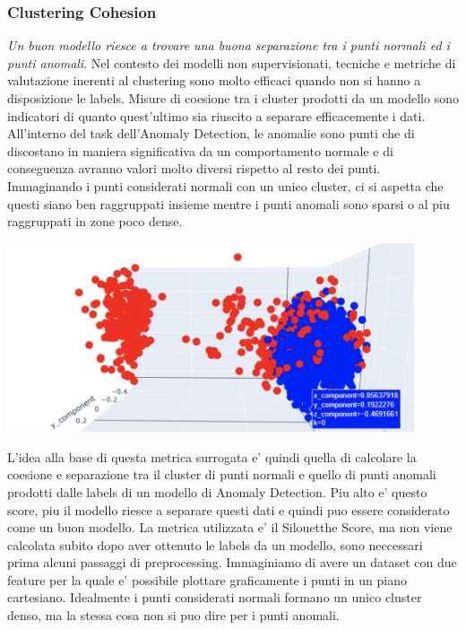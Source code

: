 \subsubsection{Clustering Cohesion}
\textit{Un buon modello riesce a trovare una buona separazione tra i punti normali ed i punti anomali}.
Nel contesto dei modelli non supervisionati, tecniche e metriche di valutazione inerenti al clustering sono molto efficaci quando non si hanno a disposizione le labels. Misure di coesione tra i cluster prodotti da un modello sono indicatori di quanto quest'ultimo sia riuscito a separare efficacemente i dati.
All'interno del task dell'Anomaly Detection, le anomalie sono punti che di discostano in maniera significativa da un comportamento normale e di conseguenza avranno valori molto diversi rispetto al resto dei punti. Immaginando i punti considerati normali con un unico cluster, ci si aspetta che questi siano ben raggruppati insieme mentre i punti anomali sono sparsi o al piu raggruppati in zone poco dense.
\begin{center}
  \includegraphics[width=12cm, scale=1]{images/plot-anomalies-normal}
\end{center}
L'idea alla base di questa metrica surrogata e' quindi quella di calcolare la coesione e separazione tra il cluster di punti normali e quello di punti anomali prodotti dalle labels di un modello di Anomaly Detection. Piu alto e' questo score, piu il modello riesce a separare questi dati e quindi puo essere considerato come un buon modello.
La metrica utilizzata e' il Silouetthe Score, ma non viene calcolata subito dopo aver ottenuto le labels da un modello, sono neccessari prima alcuni passaggi di preprocessing.
Immaginiamo di avere un dataset con due feature per la quale e' possibile plottare graficamente i punti in un piano cartesiano. Idealmente i punti considerati normali formano un unico cluster denso, ma la stessa cosa non si puo dire per i punti anomali.



